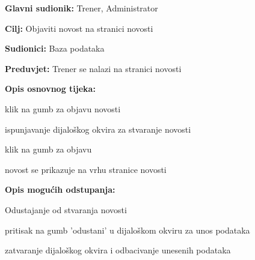 					\noindent {}
					\begin{packed_item}
	
						\item \textbf{Glavni sudionik: }Trener, Administrator
						\item  \textbf{Cilj: } Objaviti novost na stranici novosti
						\item  \textbf{Sudionici: } Baza podataka
						\item  \textbf{Preduvjet: } Trener se nalazi na stranici novosti
						\item  \textbf{Opis osnovnog tijeka:}
						
						\item[] \begin{packed_enum}
	
							\item klik na gumb za objavu novosti
							\item ispunjavanje dijaloškog okvira za stvaranje novosti
							\item klik na gumb za objavu
							\item novost se prikazuje na vrhu stranice novosti
							
						\end{packed_enum}
						
						\item  \textbf{Opis mogućih odstupanja:}
						
						\item[] \begin{packed_item}
	
							\item Odustajanje od stvaranja novosti
							\item[] \begin{packed_enum}
								
								\item pritisak na gumb 'odustani' u dijaloškom okviru za unos podataka
								\item zatvaranje dijaloškog okvira i odbacivanje unesenih podataka
								
							\end{packed_enum}
							
						\end{packed_item}
					\end{packed_item}
					
